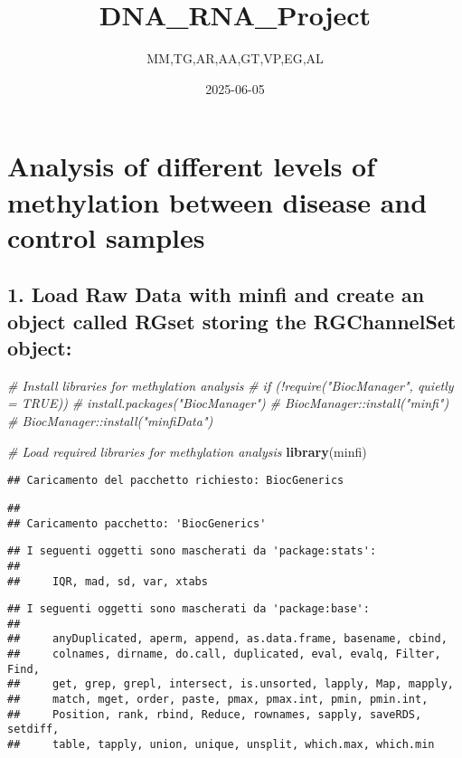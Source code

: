 \documentclass[
]{article}
\title{DNA\_RNA\_Project}
\author{MM,TG,AR,AA,GT,VP,EG,AL}
\date{2025-06-05}
\newenvironment{Shaded}{\begin{snugshade}}{\end{snugshade}}
\newcommand{\CommentTok}[1]{\textcolor[rgb]{0.56,0.35,0.01}{\textit{#1}}}
\newcommand{\FunctionTok}[1]{\textcolor[rgb]{0.13,0.29,0.53}{\textbf{#1}}}
\newcommand{\NormalTok}[1]{#1}
\begin{document}
\maketitle

\section{Analysis of different levels of methylation between disease and
control
samples}\label{analysis-of-different-levels-of-methylation-between-disease-and-control-samples}

\subsection{1. Load Raw Data with minfi and create an object called
RGset storing the RGChannelSet
object:}\label{load-raw-data-with-minfi-and-create-an-object-called-rgset-storing-the-rgchannelset-object}

\begin{Shaded}
\begin{Highlighting}[]
\CommentTok{\# Install libraries for methylation analysis }
\CommentTok{\# if (!require("BiocManager", quietly = TRUE))}
\CommentTok{\#     install.packages("BiocManager")}
\CommentTok{\# BiocManager::install("minfi")}
\CommentTok{\# BiocManager::install("minfiData")}
\end{Highlighting}
\end{Shaded}

\begin{Shaded}
\begin{Highlighting}[]
\CommentTok{\# Load required libraries for methylation analysis}
\FunctionTok{library}\NormalTok{(minfi)}
\end{Highlighting}
\end{Shaded}

\begin{verbatim}
## Caricamento del pacchetto richiesto: BiocGenerics
\end{verbatim}

\begin{verbatim}
## 
## Caricamento pacchetto: 'BiocGenerics'
\end{verbatim}

\begin{verbatim}
## I seguenti oggetti sono mascherati da 'package:stats':
## 
##     IQR, mad, sd, var, xtabs
\end{verbatim}

\begin{verbatim}
## I seguenti oggetti sono mascherati da 'package:base':
## 
##     anyDuplicated, aperm, append, as.data.frame, basename, cbind,
##     colnames, dirname, do.call, duplicated, eval, evalq, Filter, Find,
##     get, grep, grepl, intersect, is.unsorted, lapply, Map, mapply,
##     match, mget, order, paste, pmax, pmax.int, pmin, pmin.int,
##     Position, rank, rbind, Reduce, rownames, sapply, saveRDS, setdiff,
##     table, tapply, union, unique, unsplit, which.max, which.min
\end{verbatim}
\end{document}
